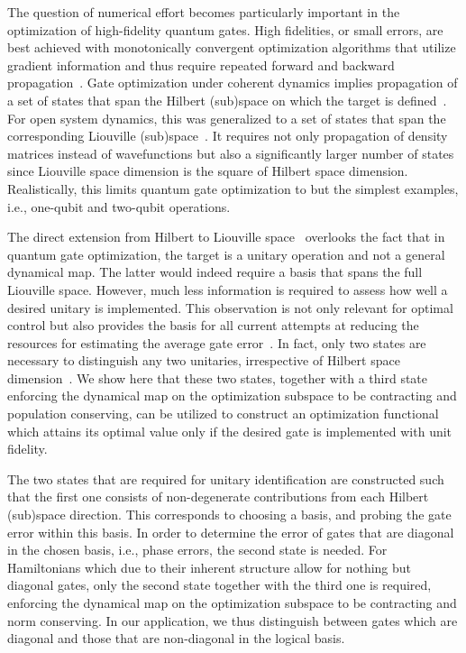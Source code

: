 The question of numerical effort becomes particularly important in the
optimization of high-fidelity quantum gates. High
fidelities, or small errors,  are best achieved with monotonically convergent
optimization algorithms that utilize
gradient information and thus require repeated forward and backward
propagation~\cite{SomloiCP93,ZhuJCP98}. Gate optimization under
coherent dynamics implies propagation of a set of states that span the
Hilbert (sub)space on which the target is
defined~\cite{JosePRL02,JosePRA03}. For open system dynamics, this was
generalized to a set of states that span the corresponding Liouville
(sub)space~\cite{KallushPRA06,OhtsukiNJP10,ToSHJPB11,FloetherNJP12}. It
requires not only propagation of density matrices instead of
wavefunctions but also a significantly larger number of states
since Liouville space dimension is the square of Hilbert space
dimension. Realistically, this limits quantum gate optimization to but
the simplest examples, i.e., one-qubit and two-qubit operations.

The direct extension from Hilbert to
Liouville space~\cite{KallushPRA06,OhtsukiNJP10,ToSHJPB11}
overlooks the fact that in quantum gate optimization,
the target is a unitary operation and not a general dynamical map. The
latter would indeed require a basis that spans the full Liouville
space. However, much less information is required to assess how
well a desired unitary is implemented. This observation is not only
relevant for optimal control but also provides the
basis for all current attempts at reducing the resources for
estimating the average gate
error~\cite{BenderskyPRL08,FlammiaPRL11,MagesanPRL11,daSilvaPRL11,ReichKochPRL13}.
In fact, only two states are necessary to distinguish any two
unitaries, irrespective of Hilbert space
dimension~\cite{ReichKochPRA13}.
We show here that these two states,
together with a third state enforcing the dynamical map on the
optimization subspace to be
contracting and population conserving,
can be utilized to construct an optimization functional
which attains its optimal value only if the desired gate is
implemented with unit fidelity.

The two states that are required for unitary identification are
constructed such that the first one consists of non-degenerate
contributions from each Hilbert (sub)space direction. This corresponds
to choosing a basis, and probing the gate error within this basis. In
order to determine the error of gates that are diagonal in the chosen
basis, i.e., phase errors, the second state is needed. For Hamiltonians
which due to their inherent structure allow for nothing but diagonal gates,
only the second state together with the third one is required, enforcing the
dynamical map on the optimization subspace to be contracting and
norm conserving. In our application, we
thus distinguish between gates which are diagonal and those that are
non-diagonal in the logical basis.

